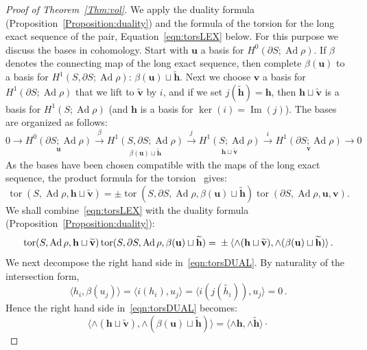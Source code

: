 \documentclass[11pt]{article}
\theoremstyle{definition}
\numberwithin{equation}{section}
\numberwithin{figure}{section}
\numberwithin{table}{section}
\DeclareMathOperator{\tor}{tor}
\DeclareMathOperator{\Ad}{Ad}
\DeclareMathOperator{\Imop}{Im}
\newcommand{\ubf}{\mathbf{u}}
\newcommand{\vbf}{\mathbf{v}}
\newcommand{\hbf}{\mathbf{h}}
\begin{document}
\begin{proof}[Proof of Theorem~\ref{Thm:vol}]
We apply the duality formula (Proposition~\ref{Proposition:duality}) and the formula of the torsion for the long exact sequence of the pair, Equation~\eqref{eqn:torsLEX} below. For this purpose we discuss the bases in cohomology. Start with $\ubf$ a basis for $H^0(\partial S;\Ad\rho)$. If $\beta$ denotes the connecting map of the long exact sequence, then complete $\beta(\ubf)$ to a basis for $H^1(S,\partial S;\Ad\rho)$: $\beta (\ubf) \sqcup \widetilde{\hbf} $. Next we choose $\vbf$ a basis for $H^1(\partial S;\Ad\rho)$ that we lift to $\widetilde{\vbf}$ by $i$, and if we set $ j(\widetilde{\hbf})=\hbf $, then $\hbf\sqcup \widetilde{\vbf }$ is a basis for $H^1(S;\Ad\rho)$ (and $\hbf$ is a basis for $\ker(i)=\Imop(j)$). The bases are organized as follows:
\begin{equation}\label{eqn:LEX}
0\to \underset { {\ubf}} {H^0(\partial S;\Ad\rho)}
\overset\beta\to\underset { {\beta(\ubf)}\sqcup \widetilde{\hbf} } {H^1(S,\partial S;\Ad\rho)}
\overset j\to \underset{ {\hbf}\sqcup \widetilde{ \vbf } }{H^1(S;\Ad\rho)}\overset i\to \underset{ \vbf}{H^1(\partial S;\Ad\rho)}\to 0
\end{equation}
As the bases have been chosen compatible with the maps of the long exact sequence, the product formula for the torsion~\cite{MilnorBullAMS} gives:
\begin{equation}\label{eqn:torsLEX}
\tor(S,\Ad\rho, \hbf \sqcup \widetilde{\vbf}) =\pm
\tor(S,\partial S,\Ad\rho, \beta (\ubf) \sqcup \widetilde{\hbf})
\tor(\partial S,\Ad\rho, \ubf, \vbf).
\end{equation}
We shall combine~\eqref{eqn:torsLEX} with the duality formula (Proposition~\ref{Proposition:duality}):
\begin{equation}\label{eqn:torsDUAL}
\tor(S,\Ad\rho, \hbf \sqcup \widetilde{\vbf})
\tor(S,\partial S,\Ad\rho, \beta (\ubf) \sqcup \widetilde{\hbf}) =\\
\pm \langle\wedge (\hbf \sqcup\widetilde{ \vbf}), \wedge (\beta (\ubf) \sqcup \widetilde{\hbf})
\rangle\,.
\end{equation}
We next decompose the right hand side in~\eqref{eqn:torsDUAL}. By naturality of the intersection form,
\[
\langle {{h_i }}, \beta(u_j) \rangle =
\langle i({{h_i }}), u_j \rangle =
\langle i(j(\widetilde{{{h_i }}})), u_j \rangle = 0\,.
\]
Hence the right hand side in~\eqref{eqn:torsDUAL} becomes:
\[
\langle
\wedge(\hbf\sqcup \widetilde{\vbf}), \wedge (\beta (\ubf) \sqcup \widetilde{\hbf})
\rangle=
\langle \wedge{\hbf}, \wedge\widetilde{{\hbf}} \rangle \cdot
\]
\end{proof}
\end{document}
